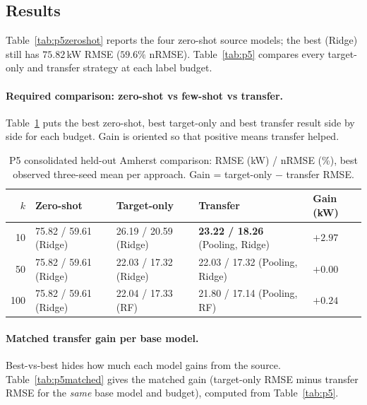 \documentclass[11pt,letterpaper]{article}
\newcommand{\bestscore}[1]{\colorbox{teal!13}{\textcolor{teal!75!black}{\bfseries #1}}}
\begin{document}
\subsection{Results}
Table~\ref{tab:p5zeroshot} reports the four zero-shot source models; the best (Ridge) still has
$75.82$\,kW RMSE ($59.6\%$ nRMSE). Table~\ref{tab:p5} compares every target-only and transfer
strategy at each label budget.



\paragraph{Required comparison: zero-shot vs few-shot vs transfer.}
Table~\ref{tab:p5consolidated} puts the best zero-shot, best target-only and best transfer result
side by side for each budget. Gain is oriented so that positive means transfer helped.

\begin{table}[!htbp]\centering\footnotesize
\caption{P5 consolidated held-out Amherst comparison: RMSE (kW) / nRMSE (\%), best observed three-seed mean per approach. Gain = target-only $-$ transfer RMSE.}\label{tab:p5consolidated}
\setlength{\tabcolsep}{5pt}
\begin{tabular}{@{}rllll@{}}\toprule
\textbf{$k$} & \textbf{Zero-shot} & \textbf{Target-only} & \textbf{Transfer} & \textbf{Gain (kW)}\\\midrule
10 & 75.82 / 59.61 (Ridge) & 26.19 / 20.59 (Ridge) & \bestscore{23.22 / 18.26} (Pooling, Ridge) & $+2.97$\\
50 & 75.82 / 59.61 (Ridge) & 22.03 / 17.32 (Ridge) & 22.03 / 17.32 (Pooling, Ridge) & $+0.00$\\
100 & 75.82 / 59.61 (Ridge) & 22.04 / 17.33 (RF) & 21.80 / 17.14 (Pooling, RF) & $+0.24$\\
\bottomrule\end{tabular}
\end{table}

\paragraph{Matched transfer gain per base model.}
Best-vs-best hides how much each model gains from the source. Table~\ref{tab:p5matched} gives
the matched gain (target-only RMSE minus transfer RMSE for the \emph{same} base model and budget),
computed from Table~\ref{tab:p5}.
\end{document}
